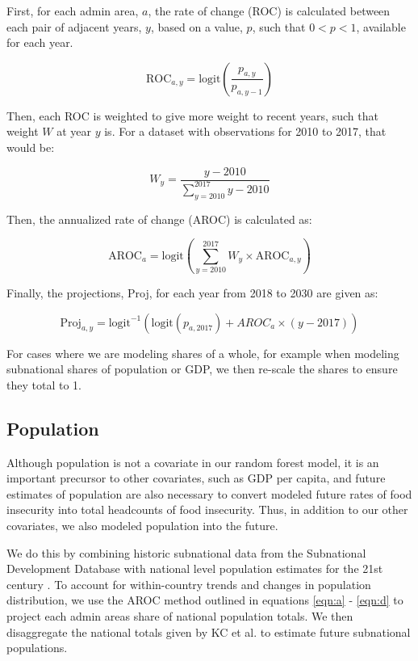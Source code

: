 \documentclass{article}
\begin{document}
First, for each admin area, $a$, the rate of change (ROC) is calculated between each pair of adjacent years, $y$, based on a value, $p$, such that $0 < p < 1$, available for each year.

\begin{equation}
  \text{ROC}_{a,y} = \text{logit} \left( \frac{p_{a,y}}{p_{a,y-1}} \right)
  \label{eqn:a}
\end{equation}

Then, each ROC is weighted to give more weight to recent years, such that weight $W$ at year $y$ is.  For a dataset with observations for 2010 to 2017, that would be:

\begin{equation}
  W_y = \frac{y - 2010}{\sum_{y=2010}^{2017} y - 2010}
  \label{eqn:b}
\end{equation}

Then, the annualized rate of change (AROC) is calculated as:

\begin{equation}
  \text{AROC}_{a} = \text{logit} \left( \sum_{y=2010}^{2017} W_y \times \text{AROC}_{a, y} \right)
  \label{eqn:c}
\end{equation}

Finally, the projections, Proj, for each year from 2018 to 2030 are given as:

\begin{equation}
  \text{Proj}_{a,y} = \text{logit}^{-1} ( \text{logit} ( p_{a,2017} ) + AROC_{a} \times ( y - 2017 ) )
  \label{eqn:d}
\end{equation}

For cases where we are modeling shares of a whole, for example when modeling subnational shares of population or GDP, we then re-scale the shares to ensure they total to 1.

\subsection{Population}
Although population is not a covariate in our random forest model, it is an important precursor to other covariates, such as GDP per capita, and future estimates of population are also necessary to convert modeled future rates of food insecurity into total headcounts of food insecurity.  Thus, in addition to our other covariates, we also modeled population into the future.

We do this by combining historic subnational data from the Subnational Development Database \citep{Smits2019} with national level population estimates for the 21st century \citep{KC2017}.  To account for within-country trends and changes in population distribution, we use the AROC method outlined in equations \ref{eqn:a} - \ref{eqn:d} to project each admin areas share of national population totals. We then disaggregate the national totals given by KC et al. to estimate future subnational populations.
\end{document}
